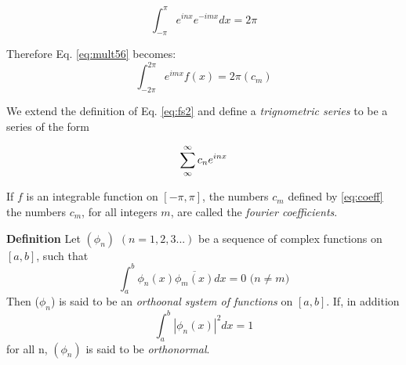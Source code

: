 \documentclass{article}
\begin{document}
\begin{equation}
\int^\pi_{-\pi} e^{inx}e^{-imx}dx =2\pi
\end{equation}

Therefore Eq. \ref{eq:mult56} becomes:
\begin{equation}
\label{eq:coeff}
\int_{-2\pi}^{2\pi}e^{imx}f(x)=2\pi (c_m)
\end{equation}

We extend the definition of Eq. \ref{eq:fs2} and define a \emph{trignometric series} to be a series of the form

\begin{equation}
\sum_{\-\infty}^\infty c_n e^{inx}
\end{equation}

If $f$ is an integrable function on $[-\pi,\pi]$, the numbers $c_m$ defined by \ref{eq:coeff}  the numbers $c_m$, for all integers $m$,  are called the \emph{fourier coefficients}.

\textbf{Definition} Let $(\phi_n)$ $(n=1,2,3...)$ be a sequence of complex functions on $[a,b]$, such that 
\begin{equation}
\label{eq:orth}
\int_a^b\phi_n(x)\overline{\phi_m(x)} dx =0 \text{            ($n\neq m$)}
\end{equation}
Then ($\phi_n$) is said to be an \emph{orthoonal system of functions} on $[a,b]$.  If, in addition 
\begin{equation}
\int_a^b |\phi_n(x)|^2 dx=1
\end{equation}
for all n, $(\phi_n)$ is said to be \emph{orthonormal}.  
\end{document}
